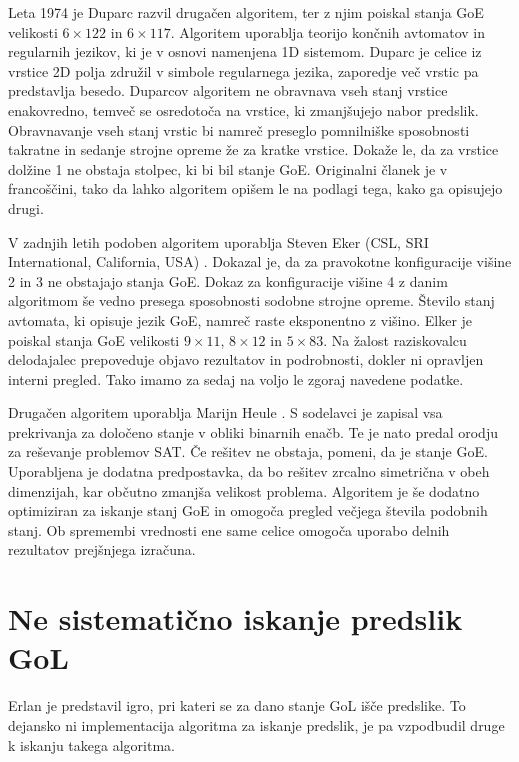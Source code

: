 \documentclass[12pt,a4paper,openany,twoside]{book}
\begin{document}
Leta 1974 je Duparc \cite{Duparc1972, Duparc1974} razvil drugačen algoritem,
ter z njim poiskal stanja GoE velikosti \(6 \times 122\) in \(6 \times 117\).
Algoritem uporablja teorijo končnih avtomatov in regularnih jezikov, ki je v
osnovi namenjena 1D sistemom.
Duparc je celice iz vrstice 2D polja združil v simbole regularnega jezika,
zaporedje več vrstic pa predstavlja besedo.
Duparcov algoritem ne obravnava vseh stanj vrstice enakovredno,
temveč se osredotoča na vrstice, ki zmanjšujejo nabor predslik.
Obravnavanje vseh stanj vrstic bi namreč preseglo pomnilniške sposobnosti
takratne in sedanje strojne opreme že za kratke vrstice.
Dokaže le, da za vrstice dolžine 1 ne obstaja stolpec, ki bi bil stanje GoE.
Originalni članek je v francoščini, tako da lahko algoritem opišem le na podlagi tega, kako ga opisujejo drugi.

V zadnjih letih podoben algoritem uporablja Steven Eker (CSL, SRI International, California, USA) \cite{achim-orphan}.
Dokazal je, da za pravokotne konfiguracije višine 2 in 3 ne obstajajo stanja GoE.
Dokaz za konfiguracije višine 4 z danim algoritmom še vedno presega sposobnosti sodobne strojne opreme.
Število stanj avtomata, ki opisuje jezik GoE, namreč raste eksponentno z višino.
Elker je poiskal stanja GoE velikosti \(9 \times 11\), \(8 \times 12\) in \(5 \times 83\).
Na žalost raziskovalcu delodajalec prepoveduje objavo rezultatov in podrobnosti, dokler ni opravljen interni pregled.
Tako imamo za sedaj na voljo le zgoraj navedene podatke.

Drugačen algoritem uporablja Marijn Heule \cite{Hartman2013}.
S sodelavci je zapisal vsa prekrivanja za določeno stanje v obliki binarnih enačb.
Te je nato predal orodju za reševanje problemov SAT.
Če rešitev ne obstaja, pomeni, da je stanje GoE.
Uporabljena je dodatna predpostavka, da bo rešitev zrcalno simetrična v obeh dimenzijah,
kar občutno zmanjša velikost problema.
Algoritem je še dodatno optimiziran za iskanje stanj GoE in
omogoča pregled večjega števila podobnih stanj.
Ob spremembi vrednosti ene same celice omogoča uporabo delnih rezultatov prejšnjega izračuna.

\section{Ne sistematično iskanje predslik GoL}

Erlan \cite{Erlan2012} je predstavil igro, pri kateri se za dano stanje
GoL išče predslike. To dejansko ni implementacija algoritma za iskanje predslik,
je pa vzpodbudil druge k iskanju takega algoritma.
\end{document}
